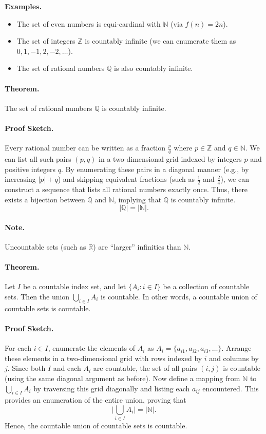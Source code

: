 \noindent\textbf{Examples.}
\begin{itemize}
    \item The set of even numbers is equi-cardinal with $\mathbb{N}$ (via $f(n) = 2n$).
    \item The set of integers $\mathbb{Z}$ is countably infinite (we can enumerate them as $0, 1, -1, 2, -2, \ldots$).
    \item The set of rational numbers $\mathbb{Q}$ is also countably infinite.
\end{itemize}

\paragraph{Theorem.}
The set of rational numbers $\mathbb{Q}$ is countably infinite.

\paragraph{Proof Sketch.}
Every rational number can be written as a fraction $\frac{p}{q}$ where $p \in \mathbb{Z}$ and $q \in \mathbb{N}$.  
We can list all such pairs $(p, q)$ in a two-dimensional grid indexed by integers $p$ and positive integers $q$.  
By enumerating these pairs in a diagonal manner (e.g., by increasing $|p| + q$) and skipping equivalent fractions (such as $\frac{1}{2}$ and $\frac{2}{4}$), we can construct a sequence that lists all rational numbers exactly once.  
Thus, there exists a bijection between $\mathbb{Q}$ and $\mathbb{N}$, implying that $\mathbb{Q}$ is countably infinite.  
\[
|\mathbb{Q}| = |\mathbb{N}|.
\]

\paragraph{Note.}
Uncountable sets (such as $\mathbb{R}$) are ``larger'' infinities than $\mathbb{N}$.

\paragraph{Theorem.}
Let $I$ be a countable index set, and let $\{A_i : i \in I\}$ be a collection of countable sets.  
Then the union $\displaystyle \bigcup_{i \in I} A_i$ is countable.  
In other words, a countable union of countable sets is countable.

\paragraph{Proof Sketch.}
For each $i \in I$, enumerate the elements of $A_i$ as $A_i = \{a_{i1}, a_{i2}, a_{i3}, \ldots\}$.  
Arrange these elements in a two-dimensional grid with rows indexed by $i$ and columns by $j$.  
Since both $I$ and each $A_i$ are countable, the set of all pairs $(i,j)$ is countable (using the same diagonal argument as before).  
Now define a mapping from $\mathbb{N}$ to $\bigcup_{i \in I} A_i$ by traversing this grid diagonally and listing each $a_{ij}$ encountered.  
This provides an enumeration of the entire union, proving that
\[
\Big|\bigcup_{i \in I} A_i\Big| = |\mathbb{N}|.
\]
Hence, the countable union of countable sets is countable.


